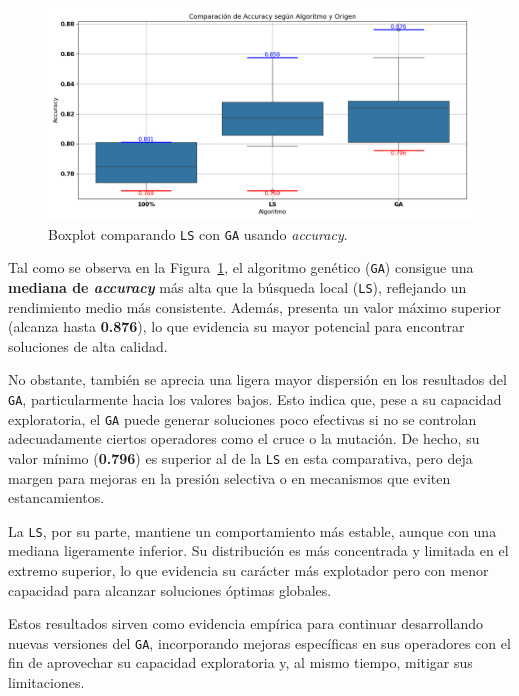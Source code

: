 \begin{figure}[htp]
    \centering
    \includegraphics[width=1\textwidth]{imagenes/evaluaciones/comparacion_ls-ga.png}
    \caption{Boxplot comparando \texttt{LS} con \texttt{GA} usando \textit{accuracy}.}
    \label{fig:lr-vs-gen-v1}
\end{figure}

Tal como se observa en la Figura~\ref{fig:lr-vs-gen-v1}, el algoritmo genético (\texttt{GA}) consigue una \textbf{mediana de \textit{accuracy}} más alta que la búsqueda local (\texttt{LS}),
reflejando un rendimiento medio más consistente.
Además, presenta un valor máximo superior (alcanza hasta \textbf{0.876}), lo que evidencia su mayor potencial para encontrar soluciones de alta calidad.

No obstante, también se aprecia una ligera mayor dispersión en los resultados del \texttt{GA}, particularmente hacia los valores bajos.
Esto indica que, pese a su capacidad exploratoria, el \texttt{GA} puede generar soluciones poco efectivas si no se controlan adecuadamente ciertos operadores como el cruce o la mutación.
De hecho, su valor mínimo (\textbf{0.796}) es superior al de la \texttt{LS} en esta comparativa,
pero deja margen para mejoras en la presión selectiva o en mecanismos que eviten estancamientos.

La \texttt{LS}, por su parte, mantiene un comportamiento más estable, aunque con una mediana ligeramente inferior.
Su distribución es más concentrada y limitada en el extremo superior, lo que evidencia su carácter más explotador pero con menor capacidad para alcanzar soluciones óptimas globales.

Estos resultados sirven como evidencia empírica para continuar desarrollando nuevas versiones del \texttt{GA},
incorporando mejoras específicas en sus operadores con el fin de aprovechar su capacidad exploratoria y, al mismo tiempo, mitigar sus limitaciones.

